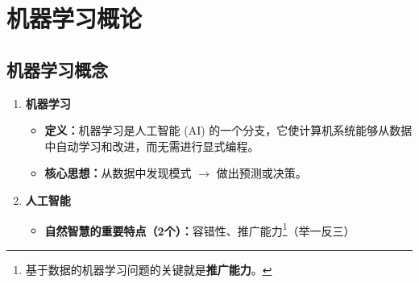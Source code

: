 \documentclass[../main.tex]{subfiles}
\begin{document}
\section{机器学习概论}\label{sec:ml-overview}

\subsection{机器学习概念}\label{sec:ml-concept}
\begin{enumerate}
    \item \textbf{机器学习}
    \begin{itemize}
        \item \textbf{定义：}机器学习是人工智能 (AI) 的一个分支，它使计算机系统能够从数据中自动学习和改进，而无需进行显式编程。
        \item \textbf{核心思想：}从数据中发现模式 $\rightarrow$ 做出预测或决策。
    \end{itemize}
    \item \textbf{人工智能}
    \begin{itemize}
        \item \textbf{自然智慧的重要特点（2个）：}容错性、推广能力\footnote{基于数据的机器学习问题的关键就是\textbf{推广能力}。}（举一反三）
    \end{itemize}
\end{enumerate}
\end{document}
